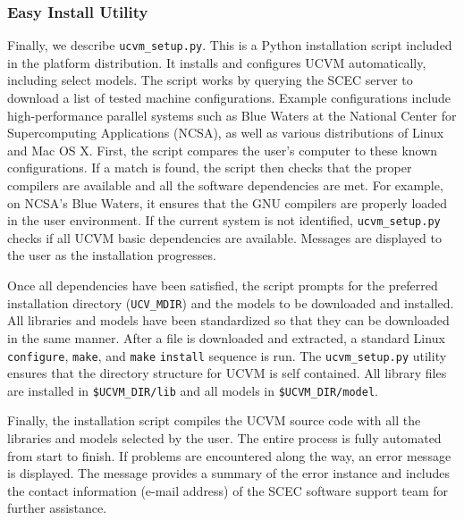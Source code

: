 
\subsubsection{Easy Install Utility}
\label{sec:easy.install}

Finally, we describe \texttt{ucvm\_setup.py}. This is a Python installation script included in the platform distribution. It installs and configures UCVM automatically, including select models. The script works by querying the SCEC server to download a list of tested machine configurations. Example configurations include high-performance parallel systems such as Blue Waters at the National Center for Supercomputing Applications (NCSA), as well as various distributions of Linux and Mac OS X. First, the script compares the user's computer to these known configurations. If a match is found, the script then checks that the proper compilers are available and all the software dependencies are met. For example, on NCSA's Blue Waters, it ensures that the GNU compilers are properly loaded in the user environment. If the current system is not identified, \texttt{ucvm\_setup.py} checks if all UCVM basic dependencies are available. Messages are displayed to the user as the installation progresses.

Once all dependencies have been satisfied, the script prompts for the preferred installation directory (\texttt{UCV\_MDIR}) and the models to be downloaded and installed. All libraries and models have been standardized so that they can be downloaded in the same manner. After a file is downloaded and extracted, a standard Linux \texttt{configure}, \texttt{make}, and \texttt{make} \texttt{install} sequence is run. The \texttt{ucvm\_setup.py} utility ensures that the directory structure for UCVM is self contained. All library files are installed in \texttt{\$UCVM\_DIR/lib} and all models in \texttt{\$UCVM\_DIR/model}.

Finally, the installation script compiles the UCVM source code with all the libraries and models selected by the user. The entire process is fully automated from start to finish. If problems are encountered along the way, an error message is displayed. The message provides a summary of the error instance and includes the contact information (e-mail address) of the SCEC software support team for further assistance.

